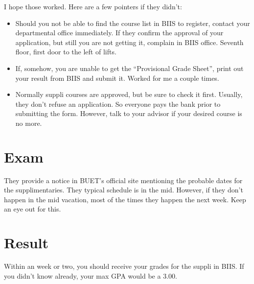 \documentclass[]{article}
\begin{document}
	I hope those worked. Here are a few pointers if they didn't:
	\begin{itemize}
		\item Should you not be able to find the course list in BIIS to register, contact your departmental office immediately. If they confirm the approval of your application, but still you are not getting it, complain in BIIS office. Seventh floor, first door to the left of lifts.
		\item If, somehow, you are unable to get the ``Provisional Grade Sheet'', print out your result from BIIS and submit it. Worked for me a couple times.
		\item Normally suppli courses are approved, but be sure to check it first. Usually, they don't refuse an application. So everyone pays the bank prior to submitting the form. However, talk to your advisor if your desired course is no more.
	\end{itemize}

	\section{Exam}
	They provide a notice in BUET's official site mentioning the probable dates for the supplimentaries. They typical schedule is in the mid. However, if they don't happen in the mid vacation, most of the times they happen the next week. Keep an eye out for this.

	\section{Result}
	Within an week or two, you should receive your grades for the suppli in BIIS. If you didn't know already, your max GPA would be a 3.00.
\end{document}
